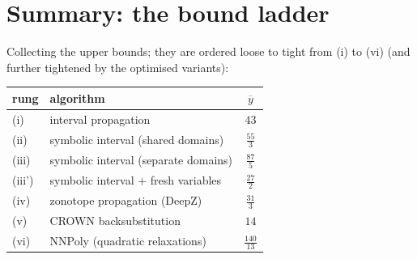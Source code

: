 \documentclass[11pt]{article}
\begin{document}
\section{Summary: the bound ladder}
Collecting the upper bounds; they are ordered loose to tight from (i) to (vi)
(and further tightened by the optimised variants):
\begin{table}[ht]\centering
\begin{tabular}{llc}\toprule
rung & algorithm & $\overline{y}$ \\
\midrule
(i) & interval propagation & $43$ \\
(ii) & symbolic interval (shared domains) & $\frac{55}{3}$ \\
(iii) & symbolic interval (separate domains) & $\frac{87}{5}$ \\
(iii') & symbolic interval + fresh variables & $\frac{27}{2}$ \\
(iv) & zonotope propagation (DeepZ) & $\frac{31}{3}$ \\
(v) & CROWN backsubstitution & $14$ \\
(vi) & NNPoly (quadratic relaxations) & $\frac{140}{13}$ \\
\bottomrule
\end{tabular}
\end{table}
\end{document}
